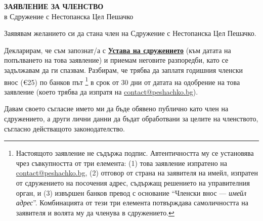 \documentclass[12pt,a4paper]{article}
\begin{document}
\pagestyle{empty}

\begin{center}
    {\LARGE \textbf{ЗАЯВЛЕНИЕ ЗА ЧЛЕНСТВО}}\\[1em]
    {\large в Сдружение с Нестопанска Цел Пешачко}
\end{center}

\vspace{1cm}

\begin{Form}

\noindent
{}

\vspace{0.8cm}

\noindent
{}

\vspace{1.5cm}

\noindent
Заявявам желанието си да стана член на Сдружение с Нестопанска Цел Пешачко.

\vspace{0.5cm}

\noindent
Декларирам, че съм запознат/а с
\textbf{\href{https://peshachko.bg/documents/устав.pdf}{Устава на сдружението}} (към
датата на попълването на това заявление) и приемам неговите разпоредби, като се
задължавам да ги спазвам. Разбирам, че трябва да заплатя годишния членски внос (€25) по
банков път \footnote{Настоящото заявление не съдържа подпис. Автентичността му се
установява чрез съвкупността от три елемента: (1) това заявление изпратено на
\href{mailto:contact@peshachko.bg}{contact@peshachko.bg}, (2) отговор от страна на
заявителя на имейл, изпратен от сдружението на посочения адрес, съдържащ решението на
управителния орган, и (3) извършен банков превод с основание ``Членски внос —
\textit{имейл адрес}''. Комбинацията от тези три елемента потвърждава самоличността на
заявителя и волята му да членува в сдружението.} в срок от 30 дни от датата на одобрение
на това заявление (което трябва да изпратя на
\href{mailto:contact@peshachko.bg}{contact@peshachko.bg}).

\vspace{0.5cm}

\noindent
Давам своето съгласие името ми да бъде обявено публично като член на сдружението, а
други лични данни да бъдат обработвани за целите на членството, съгласно действащото
законодателство.

\vspace{1cm}


\end{Form}
\end{document}
